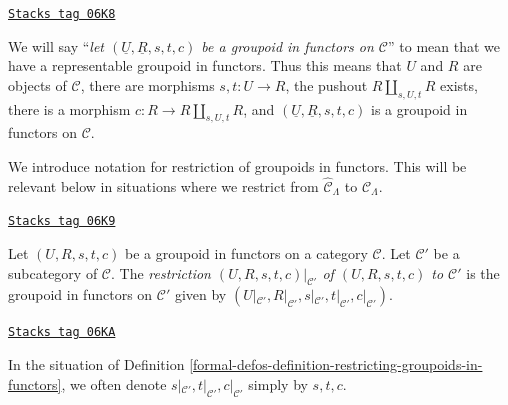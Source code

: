 \begin{remark}
\label{formal-defos-remark-simplify-terminology}
\href{https://stacks.math.columbia.edu/tag/06K8}{\texttt{Stacks tag 06K8}}

We will say ``{\it let $(\underline{U}, \underline{R}, s, t, c)$ be a
groupoid in functors on $\mathcal{C}$}'' to mean that we have
a representable groupoid in functors. Thus this means that
$U$ and $R$ are objects of $\mathcal{C}$, there are morphisms
$s, t : U \to R$, the pushout $R \amalg_{s, U, t} R$ exists,
there is a morphism $c : R \to R \amalg_{s, U, t} R$, and
$(\underline{U}, \underline{R}, s, t, c)$ is a
groupoid in functors on $\mathcal{C}$.
\end{remark}

We introduce notation for restriction of groupoids in functors. This will be
relevant below in situations where we restrict from $\widehat{\mathcal
C}_\Lambda$ to $\mathcal{C}_\Lambda$.

\begin{definition}
\label{formal-defos-definition-restricting-groupoids-in-functors}
\href{https://stacks.math.columbia.edu/tag/06K9}{\texttt{Stacks tag 06K9}}

Let $(U, R, s, t, c)$ be a groupoid in functors on a category $\mathcal{C}$.
Let $\mathcal{C}'$ be a subcategory of $\mathcal{C}$. The
{\it restriction $(U, R, s, t, c)|_{\mathcal{C}'}$ of $(U, R, s, t, c)$
to $\mathcal{C}'$} is the groupoid
in functors on $\mathcal{C}'$ given by $(U|_{\mathcal{C}'}, R|_{\mathcal
C'}, s|_{\mathcal{C}'}, t|_{\mathcal{C}'}, c|_{\mathcal{C}'})$.
\end{definition}

\begin{remark}
\label{formal-defos-remark-notation-restriction}
\href{https://stacks.math.columbia.edu/tag/06KA}{\texttt{Stacks tag 06KA}}

In the situation of Definition
\ref{formal-defos-definition-restricting-groupoids-in-functors}, we often denote
$s|_{\mathcal{C}'}, t|_{\mathcal{C}'}, c|_{\mathcal{C}'}$ simply by $s, t, c$.
\end{remark}


